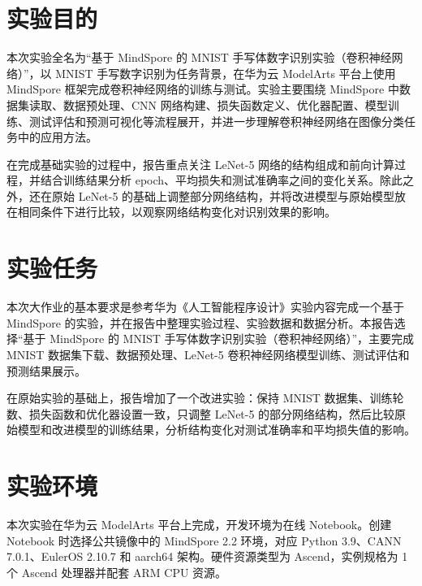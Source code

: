 \documentclass[12pt,a4paper,UTF8]{article}
\begin{document}

\newpage

\pagestyle{fancy}
\fancyhf{}
\renewcommand{\headrulewidth}{0.4pt}
\cfoot{\thepage}

\maketoc    %

\section{实验目的}

本次实验全名为“基于 MindSpore 的 MNIST 手写体数字识别实验（卷积神经网络）”，以 MNIST 手写数字识别为任务背景，在华为云 ModelArts 平台上使用 MindSpore 框架完成卷积神经网络的训练与测试。实验主要围绕 MindSpore 中数据集读取、数据预处理、CNN 网络构建、损失函数定义、优化器配置、模型训练、测试评估和预测可视化等流程展开，并进一步理解卷积神经网络在图像分类任务中的应用方法。

在完成基础实验的过程中，报告重点关注 LeNet-5 网络的结构组成和前向计算过程，并结合训练结果分析 epoch、平均损失和测试准确率之间的变化关系。除此之外，还在原始 LeNet-5 的基础上调整部分网络结构，并将改进模型与原始模型放在相同条件下进行比较，以观察网络结构变化对识别效果的影响。

\section{实验任务}

本次大作业的基本要求是参考华为《人工智能程序设计》实验内容完成一个基于 MindSpore 的实验，并在报告中整理实验过程、实验数据和数据分析。本报告选择“基于 MindSpore 的 MNIST 手写体数字识别实验（卷积神经网络）”，主要完成 MNIST 数据集下载、数据预处理、LeNet-5 卷积神经网络模型训练、测试评估和预测结果展示。

在原始实验的基础上，报告增加了一个改进实验：保持 MNIST 数据集、训练轮数、损失函数和优化器设置一致，只调整 LeNet-5 的部分网络结构，然后比较原始模型和改进模型的训练结果，分析结构变化对测试准确率和平均损失值的影响。

\section{实验环境}

本次实验在华为云 ModelArts 平台上完成，开发环境为在线 Notebook。创建 Notebook 时选择公共镜像中的 MindSpore 2.2 环境，对应 Python 3.9、CANN 7.0.1、EulerOS 2.10.7 和 aarch64 架构。硬件资源类型为 Ascend，实例规格为 1 个 Ascend 处理器并配套 ARM CPU 资源。
\end{document}
